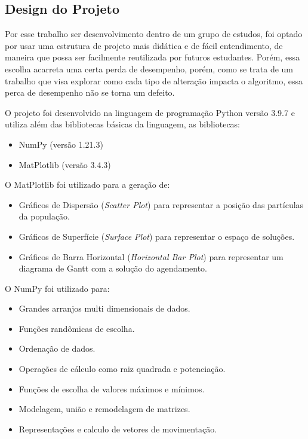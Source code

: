     \subsection{Design do Projeto}
        Por esse trabalho ser desenvolvimento dentro de um grupo de estudos, foi optado por usar uma estrutura de projeto mais didática e de fácil entendimento, de maneira que possa ser facilmente reutilizada por futuros estudantes. Porém, essa escolha acarreta uma certa perda de desempenho, porém, como se trata de um trabalho que visa explorar como cada tipo de alteração impacta o algoritmo, essa perca de desempenho não se torna um defeito.\newline
        
        O projeto foi desenvolvido na linguagem de programação Python versão 3.9.7 e utiliza além das bibliotecas básicas da linguagem, as bibliotecas:
        \begin{itemize}
            \item NumPy (versão 1.21.3)
            \item MatPlotlib (versão 3.4.3)
        \end{itemize}

        \hfill\newline
        \noindent O MatPlotlib foi utilizado para a geração de: 
        \begin{itemize}
            \item Gráficos de Dispersão (\textit{Scatter Plot}) para representar a posição das partículas da população.
            \item Gráficos de Superfície (\textit{Surface Plot}) para representar o espaço de soluções.
            \item Gráficos de Barra Horizontal (\textit{Horizontal Bar Plot}) para representar um diagrama de Gantt com a solução do agendamento.
        \end{itemize}
        
        \hfill\newline
        \noindent O NumPy foi utilizado para: 
        \begin{itemize}
            \item Grandes arranjos multi dimensionais de dados. 
            \item Funções randômicas de escolha.
            \item Ordenação de dados.
            \item Operações de cálculo como raiz quadrada e potenciação.
            \item Funções de escolha de valores máximos e mínimos.
            \item Modelagem, união e remodelagem de matrizes.
            \item Representações e calculo de vetores de movimentação.
        \end{itemize}
        
